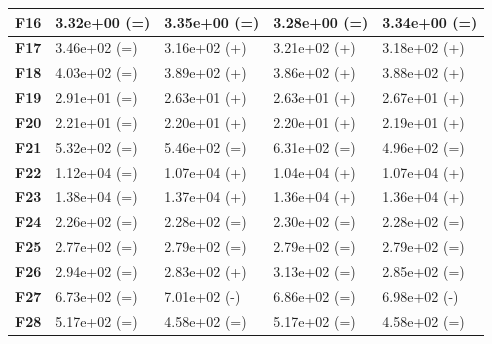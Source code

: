 \documentclass[12pt,a4paper]{report}
\begin{document}
{{{{{{{\begin{table}[h]
\begin{tabular}{|l|l|l|l|l|}
{\bf F16} & 3.32e+00 (=)        & 3.35e+00 (=)     & 3.28e+00 (=)      & 3.34e+00 (=)      \\ \hline
{\bf F17} & 3.46e+02 (=)        & 3.16e+02 (+)     & 3.21e+02 (+)      & 3.18e+02 (+)      \\ \hline
{\bf F18} & 4.03e+02 (=)        & 3.89e+02 (+)     & 3.86e+02 (+)      & 3.88e+02 (+)      \\ \hline
{\bf F19} & 2.91e+01 (=)        & 2.63e+01 (+)     & 2.63e+01 (+)      & 2.67e+01 (+)      \\ \hline
{\bf F20} & 2.21e+01 (=)        & 2.20e+01 (+)     & 2.20e+01 (+)      & 2.19e+01 (+)      \\ \hline
{\bf F21} & 5.32e+02 (=)        & 5.46e+02 (=)     & 6.31e+02 (=)      & 4.96e+02 (=)      \\ \hline
{\bf F22} & 1.12e+04 (=)        & 1.07e+04 (+)     & 1.04e+04 (+)      & 1.07e+04 (+)      \\ \hline
{\bf F23} & 1.38e+04 (=)        & 1.37e+04 (+)     & 1.36e+04 (+)      & 1.36e+04 (+)      \\ \hline
{\bf F24} & 2.26e+02 (=)        & 2.28e+02 (=)     & 2.30e+02 (=)      & 2.28e+02 (=)      \\ \hline
{\bf F25} & 2.77e+02 (=)        & 2.79e+02 (=)     & 2.79e+02 (=)      & 2.79e+02 (=)      \\ \hline
{\bf F26} & 2.94e+02 (=)        & 2.83e+02 (+)     & 3.13e+02 (=)      & 2.85e+02 (=)      \\ \hline
{\bf F27} & 6.73e+02 (=)        & 7.01e+02 (-)     & 6.86e+02 (=)      & 6.98e+02 (-)      \\ \hline
{\bf F28} & 5.17e+02 (=)        & 4.58e+02 (=)     & 5.17e+02 (=)      & 4.58e+02 (=)      \\ \hline
\end{tabular}
\end{table}

}}}}}}}
\end{document}
